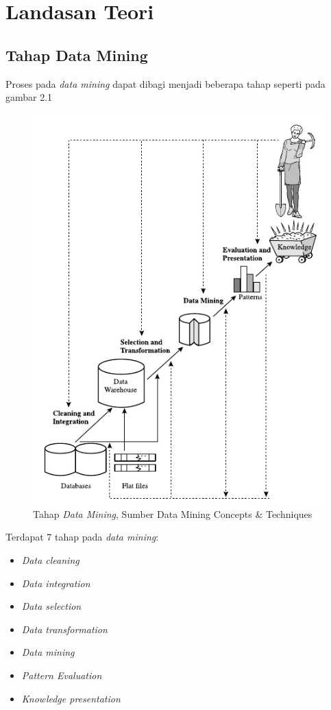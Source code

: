\chapter{Landasan Teori}
\label{chap:definition}

\section{Tahap Data Mining}
Proses pada \textsl{data mining} dapat dibagi menjadi beberapa tahap seperti pada gambar 2.1

\begin{figure}
\includegraphics[scale=1]{Gambar/tahapdatamining.jpg}
\caption[Tahap \textsl{Data Mining}, Sumber Data Mining Concepts & Techniques]{Tahap \textsl{Data Mining}, Sumber Data Mining Concepts & Techniques} 
\end{figure}

Terdapat 7 tahap pada \textsl{data mining}:
\begin{itemize}
	\item \textsl{Data cleaning}
	\item \textsl{Data integration}
	\item \textsl{Data selection}
	\item \textsl{Data transformation}
	\item \textsl{Data mining}
	\item \textsl{Pattern Evaluation}
	\item \textsl{Knowledge presentation}
\end{itemize}

